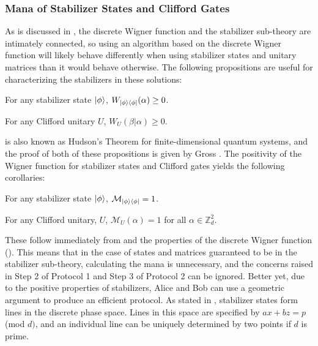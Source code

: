 \documentclass[../3Wworkreport.tex]{subfiles}
\begin{document}
\subsubsection{Mana of Stabilizer States and Clifford Gates}
\label{subsubsec:cr_stabilizer}
As is discussed in , the discrete Wigner function and the stabilizer sub-theory are intimately connected, so using an algorithm based on the discrete Wigner function will likely behave differently when using stabilizer states and unitary matrices than it would behave otherwise. The following propositions are useful for characterizing the stabilizers in these solutions:
\begin{prop}
	For any stabilizer state $\ket{\phi}$, $W_{\ket{\phi}\bra{\phi}}(\alpha) \ge 0$.
	\label{prop:wignerstabilizer}
\end{prop}
\begin{prop}
	For any Clifford unitary $U$, $W_U(\beta|\alpha) \ge 0$.
	\label{prop:wignerclifford}
\end{prop}
 is also known as Hudson's Theorem for finite-dimensional quantum systems, and the proof of both of these propositions is given by Gross \parencite*{Gross2006}. The positivity of the Wigner function for stabilizer states and Clifford gates yields the following corollaries:
\begin{corol}
	For any stabilizer state $\ket{\phi}$, $\mathcal{M}_{\ket{\phi}\bra{\phi}} = 1$.
	\label{corol:manastab}
\end{corol}
\begin{corol}
	For any Clifford unitary, $U$, $\mathcal{M}_U(\alpha) = 1$ for all $\alpha \in \mathbb{Z}_d^2$.
	\label{corol:manaclif}
\end{corol}
These follow immediately from  and the properties of the discrete Wigner function (). This means that in the case of states and matrices guaranteed to be in the stabilizer sub-theory, calculating the mana is unnecessary, and the concerns raised in Step 2 of Protocol 1 and Step 3 of Protocol 2 can be ignored. Better yet, due to the positive properties of stabilizers, Alice and Bob can use a geometric argument to produce an efficient protocol. As stated in , stabilizer states form lines in the discrete phase space. Lines in this space are specified by $ax + bz = p$ (mod $d)$, and an individual line can be uniquely determined by two points if $d$ is prime.\\ \\
\end{document}
